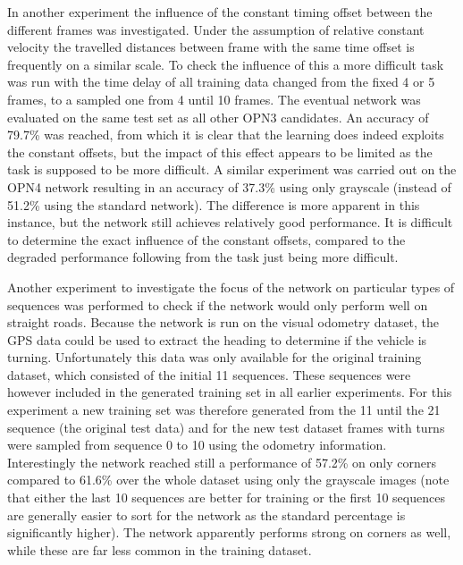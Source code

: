 In another experiment the influence of the constant timing offset between the different frames was investigated. Under the assumption of relative constant velocity the travelled distances between frame with the same time offset is frequently on a similar scale. To check the influence of this a more difficult task was run with the time delay of all training data changed from the fixed 4 or 5 frames, to a sampled one from 4 until 10 frames. The eventual network was evaluated on the same test set as all other OPN3 candidates. An accuracy of 79.7\% was reached, from which it is clear that the learning does indeed exploits the constant offsets, but the impact of this effect appears to be limited as the task is supposed to be more difficult. A similar experiment was carried out on the OPN4 network resulting in an accuracy of 37.3\% using only grayscale (instead of 51.2\% using the standard network). The difference is more apparent in this instance, but the network still achieves relatively good performance. It is difficult to determine the exact influence of the constant offsets, compared to the degraded performance following from the task just being more difficult. 

Another experiment to investigate the focus of the network on particular types of sequences was performed to check if the network would only perform well on straight roads. Because the network is run on the visual odometry dataset, the GPS data could be used to extract the heading to determine if the vehicle is turning. Unfortunately this data was only available for the original training dataset, which consisted of the initial 11 sequences. These sequences were however included in the generated training set in all earlier experiments. For this experiment a new training set was therefore generated from the 11 until the 21 sequence (the original test data) and for the new test dataset frames with turns were sampled from sequence 0 to 10 using the odometry information. Interestingly the network reached still a performance of 57.2\% on only corners compared to 61.6\% over the whole dataset using only the grayscale images (note that either the last 10 sequences are better for training or the first 10 sequences are generally easier to sort for the network as the standard percentage is significantly higher). The network apparently performs strong on corners as well, while these are far less common in the training dataset. 

